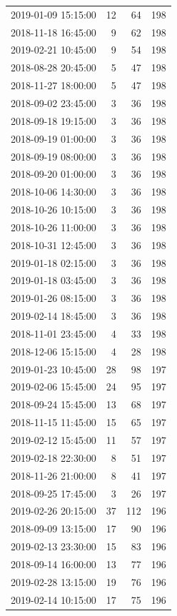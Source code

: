 \begin{tabular}{lrrr}
2019-01-09 15:15:00 & 12 & 64 & 198 \\
2018-11-18 16:45:00 & 9 & 62 & 198 \\
2019-02-21 10:45:00 & 9 & 54 & 198 \\
2018-08-28 20:45:00 & 5 & 47 & 198 \\
2018-11-27 18:00:00 & 5 & 47 & 198 \\
2018-09-02 23:45:00 & 3 & 36 & 198 \\
2018-09-18 19:15:00 & 3 & 36 & 198 \\
2018-09-19 01:00:00 & 3 & 36 & 198 \\
2018-09-19 08:00:00 & 3 & 36 & 198 \\
2018-09-20 01:00:00 & 3 & 36 & 198 \\
2018-10-06 14:30:00 & 3 & 36 & 198 \\
2018-10-26 10:15:00 & 3 & 36 & 198 \\
2018-10-26 11:00:00 & 3 & 36 & 198 \\
2018-10-31 12:45:00 & 3 & 36 & 198 \\
2019-01-18 02:15:00 & 3 & 36 & 198 \\
2019-01-18 03:45:00 & 3 & 36 & 198 \\
2019-01-26 08:15:00 & 3 & 36 & 198 \\
2019-02-14 18:45:00 & 3 & 36 & 198 \\
2018-11-01 23:45:00 & 4 & 33 & 198 \\
2018-12-06 15:15:00 & 4 & 28 & 198 \\
2019-01-23 10:45:00 & 28 & 98 & 197 \\
2019-02-06 15:45:00 & 24 & 95 & 197 \\
2018-09-24 15:45:00 & 13 & 68 & 197 \\
2018-11-15 11:45:00 & 15 & 65 & 197 \\
2019-02-12 15:45:00 & 11 & 57 & 197 \\
2019-02-18 22:30:00 & 8 & 51 & 197 \\
2018-11-26 21:00:00 & 8 & 41 & 197 \\
2018-09-25 17:45:00 & 3 & 26 & 197 \\
2019-02-26 20:15:00 & 37 & 112 & 196 \\
2018-09-09 13:15:00 & 17 & 90 & 196 \\
2019-02-13 23:30:00 & 15 & 83 & 196 \\
2018-09-14 16:00:00 & 13 & 77 & 196 \\
2019-02-28 13:15:00 & 19 & 76 & 196 \\
2019-02-14 10:15:00 & 17 & 75 & 196 \\

\end{tabular}
